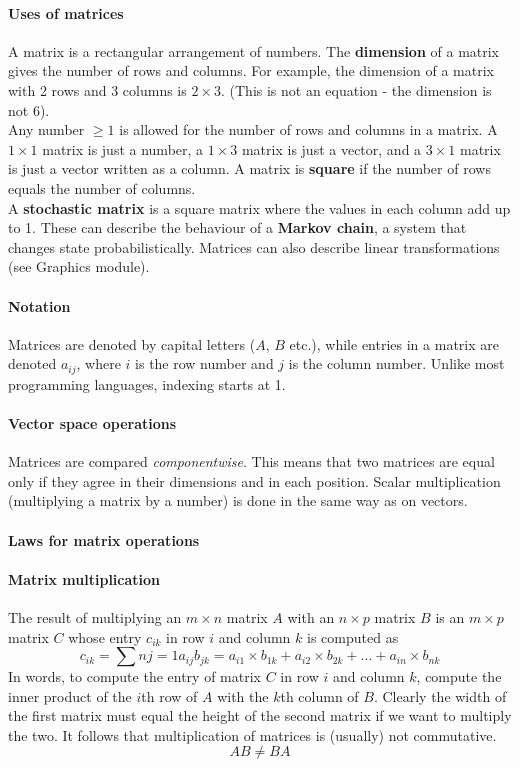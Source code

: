 \documentclass{article}
\begin{document}
\paragraph{Uses of matrices} A matrix is a rectangular arrangement of numbers. The \textbf{dimension} of a matrix gives the number of rows and columns. For example, the dimension of a matrix with 2 rows and 3 columns is $2\times 3$. (This is not an equation - the dimension is not 6).
\vspace{1mm}\\
Any number $\geq 1$ is allowed for the number of rows and columns in a matrix. A $1\times 1$ matrix is just a number, a $1\times 3$ matrix is just a vector, and a $3\times 1$ matrix is just a vector written as a column. A matrix is \textbf{square} if the number of rows equals the number of columns.
\vspace{1mm}\\
A \textbf{stochastic matrix} is a square matrix where the values in each column add up to 1. These can describe the behaviour of a \textbf{Markov chain}, a system that changes state probabilistically. Matrices can also describe linear transformations (see Graphics module).

\paragraph{Notation} Matrices are denoted by capital letters ($A$, $B$ etc.), while entries in a matrix are denoted $a_{ij}$, where $i$ is the row number and $j$ is the column number. Unlike most programming languages, indexing starts at 1.

\paragraph{Vector space operations} Matrices are compared \textit{componentwise}. This means that two matrices are equal only if they agree in their dimensions and in each position. Scalar multiplication (multiplying a matrix by a number) is done in the same way as on vectors.

\paragraph{Laws for matrix operations}

\paragraph{Matrix multiplication} The result of multiplying an $m\times n$ matrix $A$ with an $n\times p$ matrix $B$ is an $m\times p$ matrix $C$ whose entry $c_{ik}$ in row $i$ and column $k$ is computed as
$$c_{ik}=\sum{n}{j=1}a_{ij}b_{jk}=a_{i1}\times b_{1k}+a_{i2}\times b_{2k}+...+a_{in}\times b_{nk}$$
In words, to compute the entry of matrix $C$ in row $i$ and column $k$, compute the inner product of the $i$th row of $A$ with the $k$th column of $B$. Clearly the width of the first matrix must equal the height of the second matrix if we want to multiply the two. It follows that multiplication of matrices is (usually) not commutative.
$$AB\neq BA$$
\end{document}
